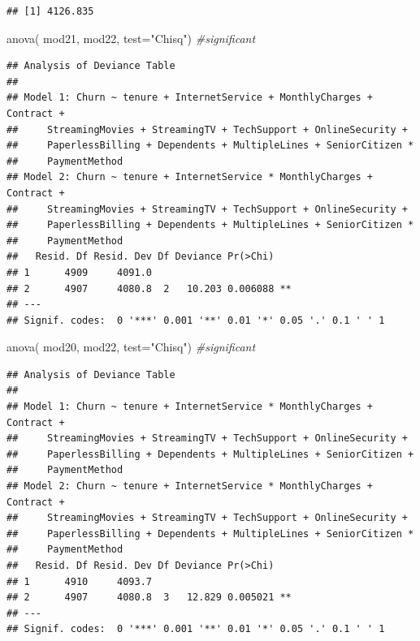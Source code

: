 \documentclass[
  twoside]{article}
\newenvironment{Shaded}{\begin{snugshade}}{\end{snugshade}}
\newcommand{\AttributeTok}[1]{\textcolor[rgb]{0.77,0.63,0.00}{#1}}
\newcommand{\CommentTok}[1]{\textcolor[rgb]{0.56,0.35,0.01}{\textit{#1}}}
\newcommand{\FunctionTok}[1]{\textcolor[rgb]{0.00,0.00,0.00}{#1}}
\newcommand{\NormalTok}[1]{#1}
\newcommand{\StringTok}[1]{\textcolor[rgb]{0.31,0.60,0.02}{#1}}
\begin{document}
\begin{verbatim}
## [1] 4126.835
\end{verbatim}

\begin{Shaded}
\begin{Highlighting}[]
\FunctionTok{anova}\NormalTok{( mod21, mod22,  }\AttributeTok{test=}\StringTok{"Chisq"}\NormalTok{) }\CommentTok{\#significant}
\end{Highlighting}
\end{Shaded}

\begin{verbatim}
## Analysis of Deviance Table
## 
## Model 1: Churn ~ tenure + InternetService + MonthlyCharges + Contract + 
##     StreamingMovies + StreamingTV + TechSupport + OnlineSecurity + 
##     PaperlessBilling + Dependents + MultipleLines + SeniorCitizen * 
##     PaymentMethod
## Model 2: Churn ~ tenure + InternetService * MonthlyCharges + Contract + 
##     StreamingMovies + StreamingTV + TechSupport + OnlineSecurity + 
##     PaperlessBilling + Dependents + MultipleLines + SeniorCitizen * 
##     PaymentMethod
##   Resid. Df Resid. Dev Df Deviance Pr(>Chi)   
## 1      4909     4091.0                        
## 2      4907     4080.8  2   10.203 0.006088 **
## ---
## Signif. codes:  0 '***' 0.001 '**' 0.01 '*' 0.05 '.' 0.1 ' ' 1
\end{verbatim}

\begin{Shaded}
\begin{Highlighting}[]
\FunctionTok{anova}\NormalTok{( mod20, mod22,  }\AttributeTok{test=}\StringTok{"Chisq"}\NormalTok{) }\CommentTok{\#significant}
\end{Highlighting}
\end{Shaded}

\begin{verbatim}
## Analysis of Deviance Table
## 
## Model 1: Churn ~ tenure + InternetService * MonthlyCharges + Contract + 
##     StreamingMovies + StreamingTV + TechSupport + OnlineSecurity + 
##     PaperlessBilling + Dependents + MultipleLines + SeniorCitizen + 
##     PaymentMethod
## Model 2: Churn ~ tenure + InternetService * MonthlyCharges + Contract + 
##     StreamingMovies + StreamingTV + TechSupport + OnlineSecurity + 
##     PaperlessBilling + Dependents + MultipleLines + SeniorCitizen * 
##     PaymentMethod
##   Resid. Df Resid. Dev Df Deviance Pr(>Chi)   
## 1      4910     4093.7                        
## 2      4907     4080.8  3   12.829 0.005021 **
## ---
## Signif. codes:  0 '***' 0.001 '**' 0.01 '*' 0.05 '.' 0.1 ' ' 1
\end{verbatim}
\end{document}
